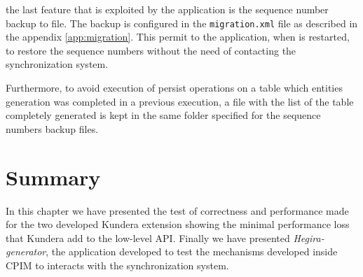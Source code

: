 \newparagraph the last feature that is exploited by the application is the sequence number backup to file. The backup is configured in the \texttt{migration.xml} file as described in the appendix \ref{app:migration}.
This permit to the application, when is restarted, to restore the sequence numbers without the need of contacting the synchronization system.

\noindent Furthermore, to avoid execution of persist operations on a table which entities generation was completed in a previous execution, a file with the list of the table completely generated is kept in the same folder specified for the sequence numbers backup files.

\section{Summary}
In this chapter we have presented the test of correctness and performance made for the two developed Kundera extension showing the minimal performance loss that Kundera add to the low-level API.
Finally we have presented \textit{Hegira-generator}, the application developed to test the mechanisms developed inside CPIM to interacts with the synchronization system.
